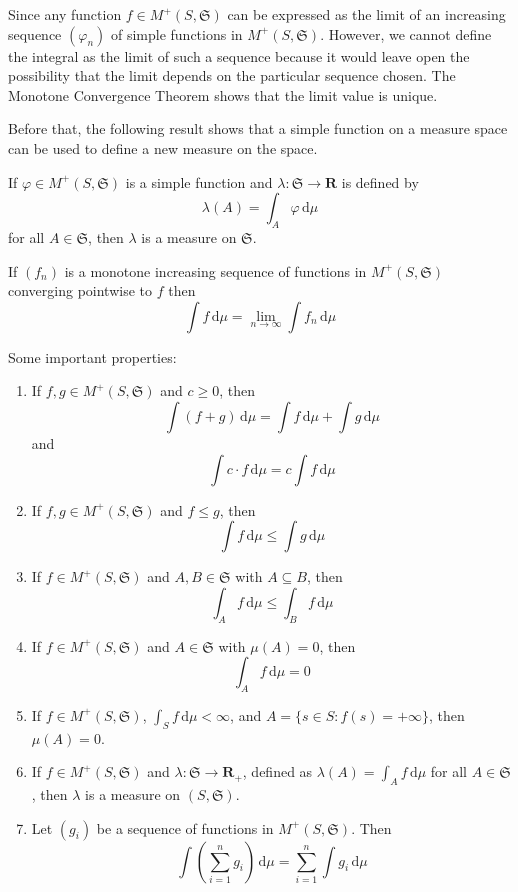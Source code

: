 Since any function $f \in M^+(S, \mathfrak{S})$ can be expressed as the limit of an increasing sequence $(\varphi_n)$ of simple functions in $M^+(S, \mathfrak{S})$. However, we cannot define the integral as the limit of such a sequence because it would leave open the possibility that the limit depends on the particular sequence chosen. The Monotone Convergence Theorem shows that the limit value is unique.

Before that, the following result shows that a simple function on a measure space can be used to define a new measure on the space.

\begin{lemma}
	If $\varphi \in M^+(S, \mathfrak{S})$ is a simple function and $\lambda: \mathfrak{S} \longrightarrow \textbf{R}$ is defined by
	\[
		\lambda(A) = \int_A \varphi\, \mathrm{d}\mu 
	\]
	for all $A \in \mathfrak{S}$, then $\lambda$ is a measure on $\mathfrak{S}$.
\end{lemma}

\begin{theorem}
	If $(f_n)$ is a monotone increasing sequence of functions in $M^+(S, \mathfrak{S})$ converging pointwise to $f$ then 
	\[
		\int f\, \mathrm{d}\mu = \lim_{n \to \infty} \int f_n \, \mathrm{d} \mu
	\]
\end{theorem}

Some important properties:

\begin{enumerate}
	\item If $f, g \in M^+(S, \mathfrak{S})$ and $c \geq 0$, then 
	\[
		\int (f+g)\, \mathrm{d}\mu = \int f\, \mathrm{d}\mu + \int g\, \mathrm{d}\mu
	\]
	and
	\[
		\int c\cdot f \, \mathrm{d}\mu = c \int f\, \mathrm{d}\mu
	\]
	\item If $f, g \in M^+(S, \mathfrak{S})$ and $f \leq g$, then
	\[
		\int f\, \mathrm{d}\mu \leq \int g\, \mathrm{d}\mu
	\]
	\item If $f \in M^+(S, \mathfrak{S})$ and $A, B \in \mathfrak{S}$ with $A \subseteq B$, then
	\[
		\int_A f\, \mathrm{d}\mu \leq \int_B f\, \mathrm{d}\mu
	\]
	\item If $f \in M^+(S, \mathfrak{S})$ and $A \in \mathfrak{S}$ with $\mu(A) = 0$, then
	\[
		\int_A f\, \mathrm{d}\mu = 0
	\]
	\item If $f \in M^+(S, \mathfrak{S})$, $\int_S f\, \mathrm{d}\mu < \infty$, and $A = \{ s \in S : f(s) = +\infty \}$, then $\mu(A) = 0$.
	\item If $f \in M^+(S, \mathfrak{S})$ and $\lambda : \mathfrak{S} \longrightarrow \textbf{R}_+$, defined as $\lambda(A) = \int_A f\, \mathrm{d}\mu$ for all $A \in \mathfrak{S}$, then $\lambda$ is a measure on $(S, \mathfrak{S})$.
	\item Let $(g_i)$ be a sequence of functions in $M^+(S, \mathfrak{S})$. Then 
	\[
		\int \left( \sum_{i=1}^n g_i \right)\, \mathrm{d}\mu = \sum_{i=1}^n \int g_i\, \mathrm{d}\mu
	\]
\end{enumerate}

